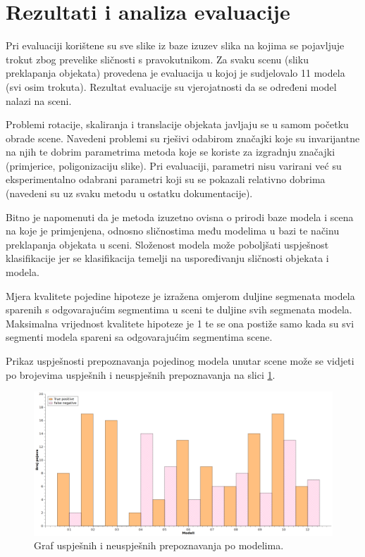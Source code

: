 \documentclass[lmodern, utf8, seminar, numeric]{fer}
\begin{document}
\section{Rezultati i analiza evaluacije}
Pri evaluaciji korištene su sve slike iz baze izuzev slika na kojima se
pojavljuje trokut zbog prevelike sličnosti s pravokutnikom. Za svaku scenu
(sliku preklapanja objekata) provedena je evaluacija u kojoj je sudjelovalo 11
modela (svi osim trokuta). Rezultat evaluacije su vjerojatnosti da se određeni
model nalazi na sceni.

Problemi rotacije, skaliranja i translacije objekata javljaju se u samom početku
obrade scene. Navedeni problemi su rješivi odabirom značajki koje su
invarijantne na njih te dobrim parametrima metoda koje se koriste za izgradnju
značajki (primjerice, poligonizaciju slike). Pri evaluaciji, parametri nisu
varirani već su eksperimentalno odabrani parametri koji su se pokazali relativno
dobrima (navedeni su uz svaku metodu u ostatku dokumentacije).

Bitno je napomenuti da je metoda izuzetno ovisna o prirodi baze modela i scena
na koje je primjenjena, odnosno sličnostima među modelima u bazi te načinu
preklapanja objekata u sceni. Složenost modela može poboljšati uspješnost
klasifikacije jer se klasifikacija temelji na uspoređivanju sličnosti objekata i
modela.

Mjera kvalitete pojedine hipoteze je izražena omjerom duljine segmenata modela
sparenih s odgovarajućim segmentima u sceni te duljine svih segmenata modela.
Maksimalna vrijednost kvalitete hipoteze je 1 te se ona postiže samo kada su svi
segmenti modela spareni sa odgovarajućim segmentima scene.

Prikaz uspješnosti prepoznavanja pojedinog modela unutar scene može se vidjeti
po brojevima uspješnih i neuspješnih prepoznavanja na slici \ref{fig:graf}.

\begin{figure}[htb]
\begin{center}
\includegraphics[width=15cm]{resources/graf.png}
\end{center}
\caption{Graf uspješnih i neuspješnih prepoznavanja po modelima.} 
\label{fig:graf}
\end{figure}
\end{document}

